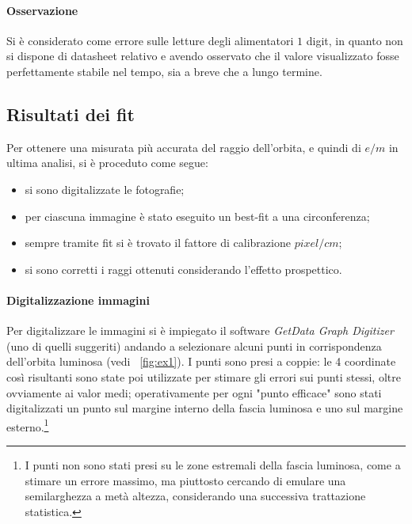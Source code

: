 \documentclass[10pt,a4paper]{article}
\begin{document}
\paragraph{Osservazione} Si è considerato come errore sulle letture degli alimentatori $1$ digit, in quanto non si dispone di datasheet relativo e avendo osservato che il valore visualizzato fosse perfettamente stabile nel tempo, sia a breve che a lungo termine.

\subsection{Risultati dei fit}

Per ottenere una misurata più accurata del raggio dell'orbita, e quindi di $e/m$ in ultima analisi, si è proceduto come segue:
\begin{itemize}
	\item si sono digitalizzate le fotografie;
	\item per ciascuna immagine è stato eseguito un best-fit a una circonferenza;
	\item sempre tramite fit si è trovato il fattore di calibrazione $pixel/cm$;
	\item si sono corretti i raggi ottenuti considerando l'effetto prospettico.
\end{itemize}

\paragraph{Digitalizzazione immagini} Per digitalizzare le immagini si è impiegato il software \emph{GetData Graph Digitizer} (uno di quelli suggeriti) andando a selezionare alcuni punti in corrispondenza dell'orbita luminosa (vedi \figurename{~\ref{fig:ex1}}).
I punti sono presi a coppie: le 4 coordinate così risultanti sono state poi utilizzate per stimare gli errori sui punti stessi, oltre ovviamente ai valor medi; operativamente per ogni "punto efficace" sono stati digitalizzati un punto sul margine interno della fascia luminosa e uno sul margine esterno.\footnote{I punti non sono stati presi su le zone estremali della fascia luminosa, come a stimare un errore massimo, ma piuttosto cercando di emulare una semilarghezza a metà altezza, considerando una successiva trattazione statistica.}
\end{document}
